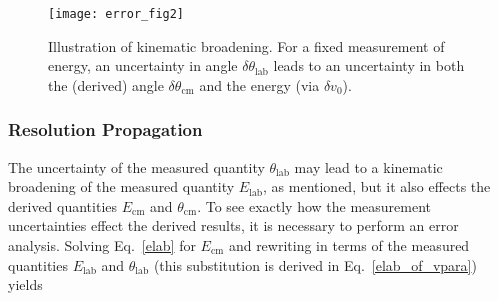 \begin{figure}%
\texttt{[image: error\_fig2]}%
\caption[Illustration of kinematic broadening]{Illustration of kinematic broadening.  For a fixed measurement of energy, an uncertainty in angle $\delta \theta_\mathrm{lab}$ leads to an uncertainty in both the (derived)  angle $\delta \theta_\mathrm{cm}$ and the energy (via $\delta v_0$).}%
\label{error_fig}%
\end{figure} 

\subsubsection{Resolution Propagation}
\label{res_prop}
The uncertainty of the measured quantity $\theta_\mathrm{lab}$ may lead to a kinematic broadening of the measured quantity $E_\mathrm{lab}$, as mentioned, but it also effects the derived quantities %
$E_\mathrm{cm}$ and $\theta_\mathrm{cm}$.  To see exactly how the measurement uncertainties effect the derived results, it is necessary to  perform an error analysis. 
Solving Eq.~\ref{elab} for $E_\mathrm{cm}$ and rewriting in terms of the measured quantities $E_\mathrm{lab}$ and $\theta_\mathrm{lab}$ (this substitution is derived in Eq.~\ref{elab_of_vpara}) yields

